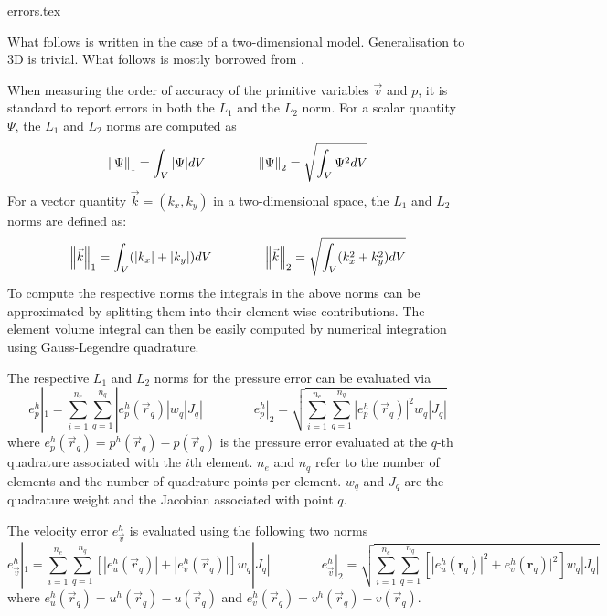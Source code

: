 \begin{flushright} {\tiny {\color{gray} errors.tex}} \end{flushright}

What follows is written in the case of a two-dimensional model. Generalisation to
3D is trivial. What follows is mostly borrowed from \cite{thmk14}.

When measuring the order of accuracy of the primitive variables $\vec{v}$ and $p$,
it is standard to report errors in both the $L_1$ and the $L_2$ norm.
For a scalar quantity $\Psi$, the $L_1$ and $L_2$ norms are computed as
\begin{equation}
\left\lVert\Psi\right\rVert_1 = \int_V |\Psi| dV
\quad\quad
\quad\quad
\left\lVert\Psi\right\rVert_2 = \sqrt{ \int_V \Psi^2 dV }
\end{equation}
For a vector quantity $\vec{k}=(k_x,k_y)$ in a two-dimensional space,
the $L_1$ and $L_2$ norms are defined as:
\begin{equation}
\left\lVert\vec{k}\right\rVert_1 = \int_V (|k_x|+|k_y|) dV
\quad\quad
\quad\quad
\left\lVert\vec{k}\right\rVert_2 = \sqrt{ \int_V (k_x^2+k_y^2) dV }
\end{equation}
To compute the respective norms
the integrals in the above norms can be approximated by splitting them
into their element-wise contributions. The element volume integral can then
be easily computed by numerical integration using Gauss-Legendre quadrature.

The respective $L_1$ and $L_2$ norms for the pressure error can be evaluated via
\begin{equation}
e_p^h|_1 = \sum_{i=1}^{n_e} \sum_{q=1}^{n_q} |e_p^h(\vec{r}_q)| w_q |J_q|
\quad\quad
\quad\quad
e_p^h|_2=\sqrt{ \sum_{i=1}^{n_e} \sum_{q=1}^{n_q} |e_p^h(\vec{r}_q)|^2 w_q |J_q| }
\end{equation}
where $e_p^h(\vec{r}_q)=p^h(\vec{r}_q) - p(\vec{r}_q)$ 
is the pressure error evaluated at the $q$-th quadrature associated with
the $i$th element. $n_e$ and $n_q$ refer to the number of elements and
the number of quadrature points per element.
$w_q$ and $J_q$ are the quadrature weight and the Jacobian associated with
point $q$.

The velocity error $e_{\vec v}^h$ is evaluated using the following two norms
\begin{equation}
e_{\vec{v}}^h|_1 = \sum_{i=1}^{n_e} \sum_{q=1}^{n_q} [ |e_u^h(\vec{r}_q)| + |e_v^h(\vec{r}_q)| ]    w_q |J_q|
\quad\quad
\quad\quad
e_{\vec v}^h|_2=\sqrt{ \sum_{i=1}^{n_e} \sum_{q=1}^{n_q} \left[ |e_u^h({\bm r}_q)|^2 +  e_v^h({\bm r}_q)|^2 \right] w_q |J_q| }
\end{equation}
where $e_u^h(\vec{r}_q)=u^h(\vec{r}_q) - u(\vec{r}_q)$ and $e_v^h(\vec{r}_q)=v^h(\vec{r}_q)-v(\vec{r}_q)$.



